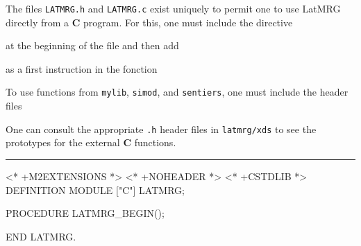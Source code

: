 
The files {\tt LATMRG.h} and  {\tt LATMRG.c} exist uniquely to permit one to 
use LatMRG directly from a {\bf C} program.   For this, one must include the directive


\noindent at the beginning of the file and then add


\noindent as a first instruction in the fonction 


To use functions from {\tt mylib}, {\tt simod}, and {\tt sentiers}, 
one must include the header files

\hfill\break
{}\hfill\break
{}

One can consult the appropriate {\tt *.h} header files in {\tt latmrg/xds} 
to see the prototypes for the external {\bf C} functions.


\bigskip\hrule
\code
\hide
<* +M2EXTENSIONS *>
<* +NOHEADER *>
<* +CSTDLIB *>
\endhide
DEFINITION MODULE ["C"] LATMRG;

PROCEDURE LATMRG_BEGIN();

END LATMRG.
\endcode
